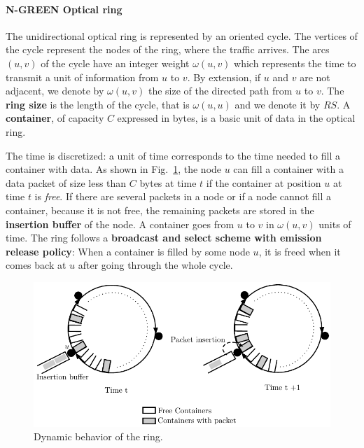 \documentclass[10pt, conference, letterpaper]{IEEEtran}
\begin{document}
  \paragraph{N-GREEN Optical ring}
   
  The unidirectional optical ring is represented by an oriented cycle. The vertices of the cycle represent the nodes of the ring, where the traffic arrives. The arcs $(u,v)$ of the cycle have an integer weight $\omega(u,v)$ which represents the time to transmit a unit of information from $u$ to $v$. By extension, if $u$ and $v$ are not adjacent, we denote by $\omega(u,v)$ the size of the directed path from $u$ to $v$.  The \textbf{ring size} is the length of the cycle, that is $\omega(u,u)$ and we denote it by $RS$. A {\bf container}, of capacity $C$  expressed in bytes, is a basic unit of data in the optical ring. 
  
  The time is discretized: a unit of time corresponds to the time needed to fill a container with data.
  As shown in Fig.~\ref{fig:containers}, the node $u$ can fill a container with a data packet of size less than $C$ bytes at time $t$ if the container at position $u$ at time $t$ is \emph{free}. 
  If there are several packets in a node or if a node cannot fill a container, because it is not free, 
  the remaining packets are stored in the {\bf insertion buffer} of the node. 
  A container goes from $u$ to $v$ in $\omega(u,v)$ units of time. The ring follows a {\bf broadcast and select scheme with emission release policy}: When a container is filled by some node $u$, it is freed when it comes back at $u$ after going through the whole cycle.
   
  
  \begin{figure}[h!]

        \begin{center}
      \hspace{-2.3cm}\includegraphics[scale=0.65]{containers}
   
   
      \end{center} 

   
     \caption{Dynamic behavior of the ring.}\label{fig:containers}

  \end{figure}
  
\end{document}
